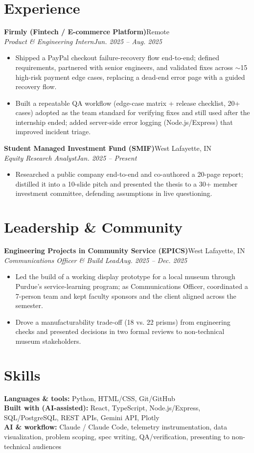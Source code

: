 \documentclass[10pt,letterpaper]{article}
\newcommand{\entry}[4]{%
  \textbf{#1}\hfill #2\\[1pt]
  \textit{#3}\hfill \textit{#4}\\[1pt]
}
\begin{document}
\section{Experience}
\entry{Firmly (Fintech / E-commerce Platform)}{Remote}{Product \& Engineering Intern}{Jun. 2025 -- Aug. 2025}
\begin{itemize}
  \item Shipped a PayPal checkout failure-recovery flow end-to-end; defined requirements, partnered with senior engineers, and validated fixes across $\sim$15 high-risk payment edge cases, replacing a dead-end error page with a guided recovery flow.
  \item Built a repeatable QA workflow (edge-case matrix + release checklist, 20+ cases) adopted as the team standard for verifying fixes and still used after the internship ended; added server-side error logging (Node.js/Express) that improved incident triage.
\end{itemize}
\entry{Student Managed Investment Fund (SMIF)}{West Lafayette, IN}{Equity Research Analyst}{Jan. 2025 -- Present}
\begin{itemize}
  \item Researched a public company end-to-end and co-authored a 20-page report; distilled it into a 10-slide pitch and presented the thesis to a 30+ member investment committee, defending assumptions in live questioning.
\end{itemize}

\section{Leadership \& Community}
\entry{Engineering Projects in Community Service (EPICS)}{West Lafayette, IN}{Communications Officer \& Build Lead}{Aug. 2025 -- Dec. 2025}
\begin{itemize}
  \item Led the build of a working display prototype for a local museum through Purdue's service-learning program; as Communications Officer, coordinated a 7-person team and kept faculty sponsors and the client aligned across the semester.
  \item Drove a manufacturability trade-off (18 vs. 22 prisms) from engineering checks and presented decisions in two formal reviews to non-technical museum stakeholders.
\end{itemize}

\section{Skills}
\textbf{Languages \& tools:} Python, HTML/CSS, Git/GitHub\\
\textbf{Built with (AI-assisted):} React, TypeScript, Node.js/Express, SQL/PostgreSQL, REST APIs, Gemini API, Plotly\\
\textbf{AI \& workflow:} Claude / Claude Code, telemetry instrumentation, data visualization, problem scoping, spec writing, QA/verification, presenting to non-technical audiences
\end{document}
